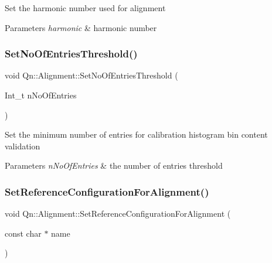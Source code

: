 Set the harmonic number used for alignment 
\begin{DoxyParams}{Parameters}
{\em harmonic} & harmonic number \\
\hline
\end{DoxyParams}
\mbox{\label{classQn_1_1Alignment_a70d38db6adb97c47746d00f28f2b605c}} 
\subsubsection{\texorpdfstring{Set\+No\+Of\+Entries\+Threshold()}{SetNoOfEntriesThreshold()}}
{\footnotesize\ttfamily void Qn\+::\+Alignment\+::\+Set\+No\+Of\+Entries\+Threshold (\begin{DoxyParamCaption}\item[{Int\+\_\+t}]{n\+No\+Of\+Entries }\end{DoxyParamCaption})\hspace{0.3cm}{\ttfamily [inline]}}

Set the minimum number of entries for calibration histogram bin content validation 
\begin{DoxyParams}{Parameters}
{\em n\+No\+Of\+Entries} & the number of entries threshold \\
\hline
\end{DoxyParams}
\mbox{\label{classQn_1_1Alignment_a03d25738c83b68757e23eabc563d60c6}} 
\subsubsection{\texorpdfstring{Set\+Reference\+Configuration\+For\+Alignment()}{SetReferenceConfigurationForAlignment()}}
{\footnotesize\ttfamily void Qn\+::\+Alignment\+::\+Set\+Reference\+Configuration\+For\+Alignment (\begin{DoxyParamCaption}\item[{const char $\ast$}]{name }\end{DoxyParamCaption})}

